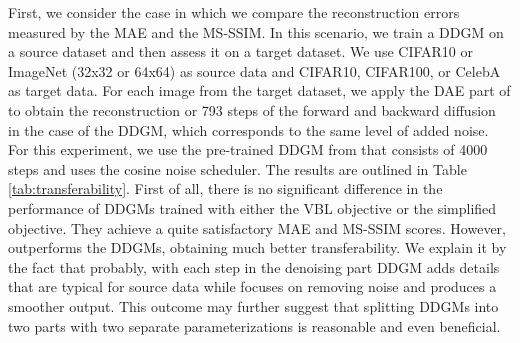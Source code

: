 \begin{table}[t]
  \centering
  \caption{Reconstruction errors measured by MAE~($\downarrow$), MS-SSIM~($\uparrow$) for images noised with $\beta_1=0.1$. \\
  	*To evaluate models trained on CIFAR10, we downscale CelebA to $32\times32$. \textbf{Best results in bold.}}
  \vskip -5pt
  \label{tab:transferability}
\end{table}

First, we consider the case in which we compare the reconstruction errors measured by the MAE and the MS-SSIM. In this scenario, we train a DDGM on a source dataset and then assess it on a target dataset. We use CIFAR10 or ImageNet (32x32 or 64x64) as source data and CIFAR10, CIFAR100, or CelebA as target data. For each image from the target dataset, we apply the DAE part of \ours{} to obtain the reconstruction or 793 steps of the forward and backward diffusion in the case of the DDGM, which corresponds to the same level of added noise. For this experiment, we use the pre-trained DDGM from \cite{nichol2021improved} that consists of 4000 steps and uses the cosine noise scheduler. The results are outlined in Table \ref{tab:transferability}. First of all, there is no significant difference in the performance of DDGMs trained with either the VBL objective or the simplified objective. They achieve a quite satisfactory MAE and MS-SSIM scores. However, \ours{} outperforms the DDGMs, obtaining much better transferability. We explain it by the fact that probably, with each step in the denoising part DDGM adds details that are typical for source data while \ours{} focuses on removing noise and produces a smoother output. This outcome may further suggest that splitting DDGMs into two parts with two separate parameterizations is reasonable and even beneficial.

